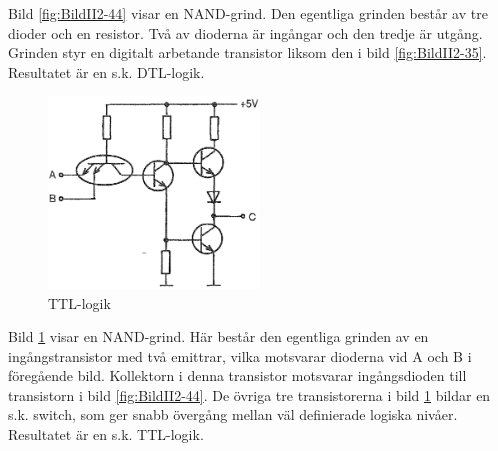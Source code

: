 Bild \ref{fig:BildII2-44} visar en NAND-grind.
Den egentliga grinden består av tre dioder och en resistor.
Två av dioderna är ingångar och den tredje är utgång.
Grinden styr en digitalt arbetande transistor liksom den i bild
\ref{fig:BildII2-35}.
Resultatet är en s.k. DTL-logik.

\begin{figure}
\includegraphics[width=0.5\textwidth]{images/cropped_pdfs/bild_2_2-45.pdf}
\caption{TTL-logik}
\label{fig:BildII2-45}
\end{figure}

Bild \ref{fig:BildII2-45} visar en NAND-grind.
Här består den egentliga grinden av en ingångstransistor med två emittrar,
vilka motsvarar dioderna vid A och B i föregående bild.
Kollektorn i denna transistor motsvarar ingångsdioden till transistorn i bild
\ref{fig:BildII2-44}.
De övriga tre transistorerna i bild \ref{fig:BildII2-45} bildar en s.k. switch,
som ger snabb övergång mellan väl definierade logiska nivåer.
Resultatet är en s.k. TTL-logik.
